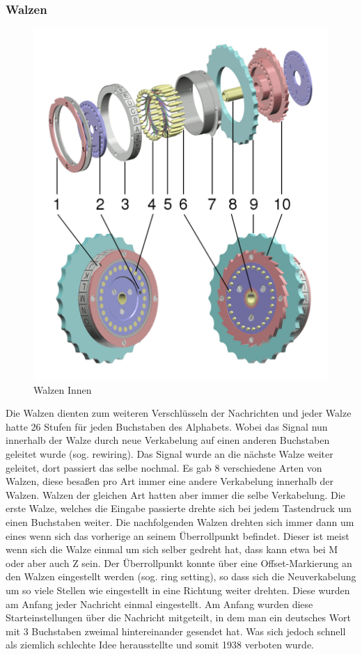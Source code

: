 \subsubsection{Walzen}
\label{sec:rader}
\begin{figure}

\includegraphics[scale=0.15]{Enigma_rotor_exploded_view.png}
\caption{Walzen Innen}
\label{fig:rotorex}
\end{figure}
Die Walzen dienten zum weiteren Verschlüsseln der Nachrichten und jeder Walze hatte 26 Stufen für jeden Buchstaben des Alphabets. Wobei das Signal nun innerhalb der Walze durch neue Verkabelung auf einen anderen Buchstaben geleitet wurde (sog. rewiring). Das Signal wurde an die nächste Walze weiter geleitet, dort passiert das selbe nochmal. Es gab 8 verschiedene Arten von Walzen, diese besaßen pro Art immer eine andere Verkabelung innerhalb der Walzen. Walzen der gleichen Art hatten aber immer die selbe Verkabelung. Die erste Walze, welches die Eingabe passierte drehte sich bei jedem Tastendruck um einen Buchstaben weiter. Die nachfolgenden Walzen drehten sich immer dann um eines wenn sich das vorherige an seinem Überrollpunkt befindet. Dieser ist meist wenn sich die Walze einmal um sich selber gedreht hat, dass kann etwa bei M oder aber auch Z sein. Der Überrollpunkt konnte über eine Offset-Markierung an den Walzen eingestellt werden (sog. ring setting), so dass sich die Neuverkabelung um so viele Stellen wie eingestellt in eine Richtung weiter drehten. Diese wurden am Anfang jeder Nachricht einmal eingestellt. Am Anfang wurden diese Starteinstellungen über die Nachricht mitgeteilt, in dem man ein deutsches Wort mit 3 Buchstaben zweimal hintereinander gesendet hat. Was sich jedoch schnell als ziemlich schlechte Idee herausstellte und somit 1938 verboten wurde.

